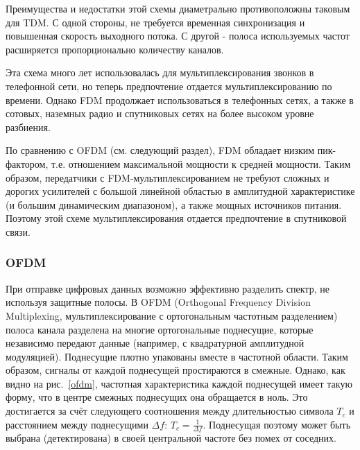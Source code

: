 Преимущества и недостатки этой схемы диаметрально противоположны таковым для TDM.
С одной стороны, не требуется временная синхронизация и повышенная скорость выходного потока.
С другой - полоса используемых частот расширяется пропорционально количеству каналов.

Эта схема много лет использовалась для мультиплексирования звонков в телефонной сети, но теперь предпочтение отдается мультиплексированию по времени.
Однако FDM продолжает использоваться в телефонных сетях, а также в сотовых, наземных радио и спутниковых сетях на более высоком уровне разбиения.

По сравнению с OFDM (см. следующий раздел), FDM обладает низким пик-фактором, т.е. отношением максимальной мощности к средней мощности.
Таким образом, передатчики с FDM-мультиплексированием не требуют сложных и дорогих усилителей с большой линейной областью в амплитудной характеристике (и большим динамическим диапазоном), а также мощных источников питания.
Поэтому этой схеме мультиплексирования отдается предпочтение в спутниковой связи.


\subsubsection{OFDM}

При отправке цифровых данных возможно эффективно разделить спектр, не используя защитные полосы.
В OFDM (Orthogonal Frequency Division Multiplexing, мультиплексирование с ортогональным частотным разделением) полоса канала разделена на многие ортогональные поднесущие, которые независимо передают данные (например, с квадратурной амплитудной модуляцией).
Поднесущие плотно упакованы вместе в частотной области.
Таким образом, сигналы от каждой поднесущей простираются в смежные.
Однако, как видно на рис.~\ref{ofdm}, частотная характеристика каждой поднесущей имеет такую форму, что в центре смежных поднесущих она обращается в ноль.
Это достигается за счёт следующего соотношения между длительностью символа $T_c$ и расстоянием между поднесущими $\Delta f$: $ T_c = \frac{1}{\Delta f}$.
Поднесущая поэтому может быть выбрана (детектирована) в своей центральной частоте без помех от соседних.

